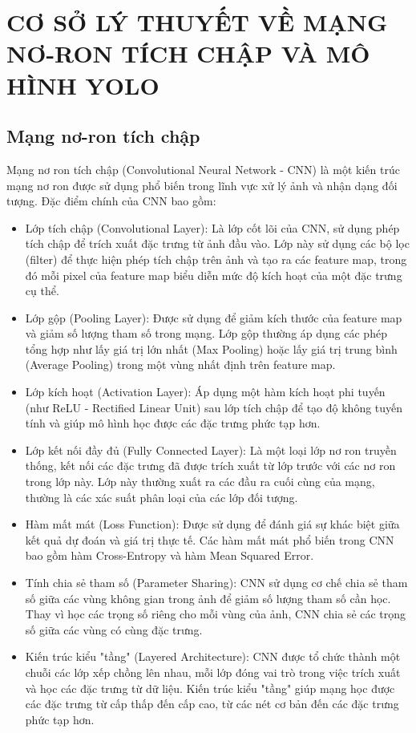 \chapter{CƠ SỞ LÝ THUYẾT VỀ MẠNG NƠ-RON TÍCH CHẬP VÀ MÔ HÌNH YOLO}

\section{Mạng nơ-ron tích chập}
Mạng nơ ron tích chập (Convolutional Neural Network - CNN) là một kiến trúc mạng nơ ron được sử dụng phổ biến trong lĩnh vực xử lý ảnh và nhận dạng đối tượng. Đặc điểm chính của CNN bao gồm:

\begin{itemize}
	\item Lớp tích chập (Convolutional Layer): Là lớp cốt lõi của CNN, sử dụng phép tích chập để trích xuất đặc trưng từ ảnh đầu vào. Lớp này sử dụng các bộ lọc (filter) để thực hiện phép tích chập trên ảnh và tạo ra các feature map, trong đó mỗi pixel của feature map biểu diễn mức độ kích hoạt của một đặc trưng cụ thể.
	\item Lớp gộp (Pooling Layer): Được sử dụng để giảm kích thước của feature map và giảm số lượng tham số trong mạng. Lớp gộp thường áp dụng các phép tổng hợp như lấy giá trị lớn nhất (Max Pooling) hoặc lấy giá trị trung bình (Average Pooling) trong một vùng nhất định trên feature map.
	\item Lớp kích hoạt (Activation Layer): Áp dụng một hàm kích hoạt phi tuyến (như ReLU - Rectified Linear Unit) sau lớp tích chập để tạo độ không tuyến tính và giúp mô hình học được các đặc trưng phức tạp hơn.
	\item Lớp kết nối đầy đủ (Fully Connected Layer): Là một loại lớp nơ ron truyền thống, kết nối các đặc trưng đã được trích xuất từ lớp trước với các nơ ron trong lớp này. Lớp này thường xuất ra các đầu ra cuối cùng của mạng, thường là các xác suất phân loại của các lớp đối tượng.
	\item Hàm mất mát (Loss Function): Được sử dụng để đánh giá sự khác biệt giữa kết quả dự đoán và giá trị thực tế. Các hàm mất mát phổ biến trong CNN bao gồm hàm Cross-Entropy và hàm Mean Squared Error.
	\item Tính chia sẻ tham số (Parameter Sharing): CNN sử dụng cơ chế chia sẻ tham số giữa các vùng không gian trong ảnh để giảm số lượng tham số cần học. Thay vì học các trọng số riêng cho mỗi vùng của ảnh, CNN chia sẻ các trọng số giữa các vùng có cùng đặc trưng.
	\item Kiến trúc kiểu "tầng" (Layered Architecture): CNN được tổ chức thành một chuỗi các lớp xếp chồng lên nhau, mỗi lớp đóng vai trò trong việc trích xuất và học các đặc trưng từ dữ liệu. Kiến trúc kiểu "tầng" giúp mạng học được các đặc trưng từ cấp thấp đến cấp cao, từ các nét cơ bản đến các đặc trưng phức tạp hơn.
\end{itemize}

